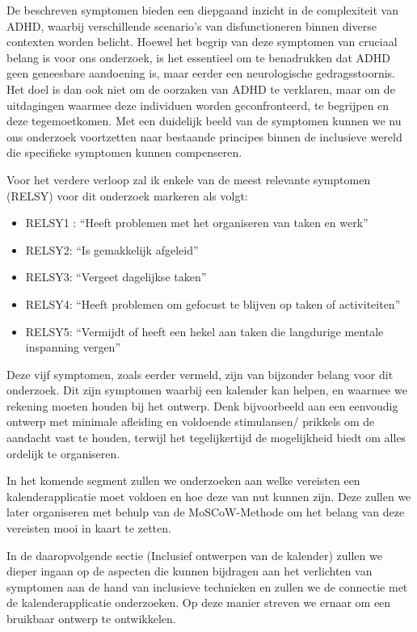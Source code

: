 De beschreven symptomen bieden een diepgaand inzicht in de complexiteit van ADHD, waarbij verschillende scenario's van disfunctioneren binnen diverse contexten worden belicht. Hoewel het begrip van deze symptomen van cruciaal belang is voor ons onderzoek, is het essentieel om te benadrukken dat ADHD geen geneesbare aandoening is, maar eerder een neurologische gedragsstoornis. Het doel is dan ook niet om de oorzaken van ADHD te verklaren, maar om de uitdagingen waarmee deze individuen worden geconfronteerd, te begrijpen en deze tegemoetkomen. Met een duidelijk beeld van de symptomen kunnen we nu ons onderzoek voortzetten naar bestaande principes binnen de inclusieve wereld die specifieke symptomen kunnen compenseren.\newline

Voor het verdere verloop zal ik enkele van de meest relevante symptomen (RELSY) voor dit onderzoek markeren als volgt:
\begin{itemize}[label=-]
    \item RELSY1 : “Heeft problemen met het organiseren van taken en werk”
    \item RELSY2:  “Is gemakkelijk afgeleid” 
    \item RELSY3:  “Vergeet dagelijkse taken”   
    \item RELSY4:  “Heeft problemen om gefocust te blijven op taken of activiteiten”
    \item RELSY5: “Vermijdt of heeft een hekel aan taken die langdurige mentale inspanning vergen”
\end{itemize}
Deze vijf symptomen, zoals eerder vermeld, zijn van bijzonder belang voor dit onderzoek. Dit zijn symptomen waarbij een kalender kan helpen, en waarmee we rekening moeten houden bij het ontwerp. Denk bijvoorbeeld aan een eenvoudig ontwerp met minimale afleiding en voldoende stimulansen/ prikkels om de aandacht vast te houden, terwijl het tegelijkertijd de mogelijkheid biedt om alles ordelijk te organiseren. \newline

In het komende segment zullen we onderzoeken aan welke vereisten een kalenderapplicatie moet voldoen en hoe deze van nut kunnen zijn. Deze zullen we later organiseren met behulp van de MoSCoW-Methode om het belang van deze vereisten mooi in kaart te zetten. \newline

In de daaropvolgende sectie (Inclusief ontwerpen van de kalender) zullen we dieper ingaan op de aspecten die kunnen bijdragen aan het verlichten van symptomen aan de hand van inclusieve technieken en zullen we de connectie met de kalenderapplicatie onderzoeken. Op deze manier streven we ernaar om een bruikbaar ontwerp te ontwikkelen. 

